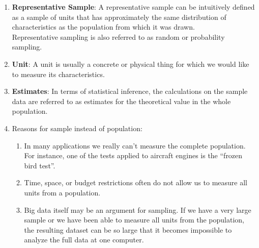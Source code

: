 \begin{enumerate}
    \item \textbf{Representative Sample}\label{Sampling Plans/Representative Sample}:  A representative sample can be intuitively defined as a sample of units that has approximately the same distribution of characteristics as the population from which it was drawn.
    \hfill \cite{statistics/book/Statistics-for-Data-Scientists/Maurits-Kaptein}
    \\
    Representative sampling is also referred to as random or probability sampling.
    \hfill \cite{statistics/book/Statistics-for-Data-Scientists/Maurits-Kaptein}

    \item \textbf{Unit}\label{Sampling Plans/Unit}: A unit is usually a concrete or physical thing for which we would like to measure its characteristics.
    \hfill \cite{statistics/book/Statistics-for-Data-Scientists/Maurits-Kaptein}

    \item \textbf{Estimates}\label{Sampling Plans/Estimates}: In terms of statistical inference, the calculations on the sample data are referred to as estimates for the theoretical value in the whole population.
    \hfill \cite{statistics/book/Statistics-for-Data-Scientists/Maurits-Kaptein}


    \vspace{0.5cm}

    \item Reasons for sample instead of population:
    \begin{enumerate}
        \item In many applications we really can’t measure the complete population. For instance, one of the tests applied to aircraft engines is the “frozen bird test”. 
        \hfill \cite{statistics/book/Statistics-for-Data-Scientists/Maurits-Kaptein}

        \item Time, space, or budget restrictions often do not allow us to measure all units from a population.
        \hfill \cite{statistics/book/Statistics-for-Data-Scientists/Maurits-Kaptein}

        \item  Big data itself may be an argument for sampling. If we have a very large sample or we have been able to measure all units from the population, the resulting dataset can be so large that it becomes impossible to analyze the full data at one computer.
        \hfill \cite{statistics/book/Statistics-for-Data-Scientists/Maurits-Kaptein}
    \end{enumerate}


\end{enumerate}
